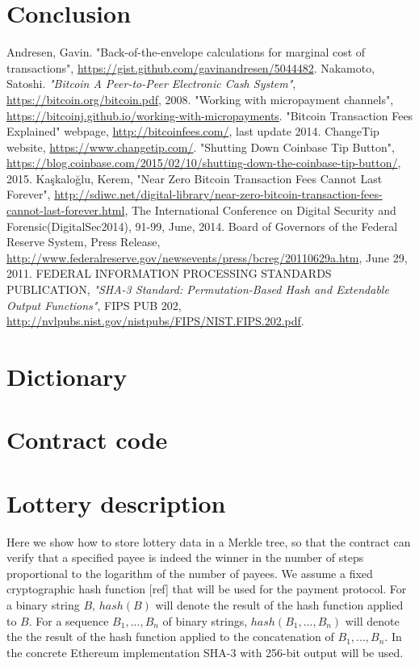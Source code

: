 \documentclass[a4paper]{article}
\begin{document}
\section{Conclusion}
\begin{thebibliography}{9}
 Andresen, Gavin. "Back-of-the-envelope calculations for marginal cost of transactions",
    \url{https://gist.github.com/gavinandresen/5044482}.
 Nakamoto, Satoshi. \textit{"Bitcoin A Peer-to-Peer Electronic Cash System"},
    \url{https://bitcoin.org/bitcoin.pdf}, 2008.
\bibitem[BITCOINJ] "Working with micropayment channels", \url{https://bitcoinj.github.io/working-with-micropayments}.
 "Bitcoin Transaction Fees Explained" webpage, \url{http://bitcoinfees.com/},  last update 2014.
 ChangeTip website, \url{https://www.changetip.com/}.
 "Shutting Down Coinbase Tip Button",
    \url{https://blog.coinbase.com/2015/02/10/shutting-down-the-coinbase-tip-button/}, 2015.
Kaşkaloğlu, Kerem, "Near Zero Bitcoin Transaction Fees Cannot Last Forever",
    \url{http://sdiwc.net/digital-library/near-zero-bitcoin-transaction-fees-cannot-last-forever.html},
    The International Conference on Digital Security and Forensic(DigitalSec2014), 91-99, June, 2014.
 Board of Governors of the Federal Reserve System, Press Release,
    \url{http://www.federalreserve.gov/newsevents/press/bcreg/20110629a.htm}, June 29, 2011.
 FEDERAL INFORMATION PROCESSING STANDARDS PUBLICATION,
    \textit{"SHA-3 Standard: Permutation-Based Hash and Extendable Output Functions"}, FIPS PUB 202,
    \url{http://nvlpubs.nist.gov/nistpubs/FIPS/NIST.FIPS.202.pdf}.
\end{thebibliography}
\appendix
\section{Dictionary}
\section{Contract code}
\section{Lottery description}
    Here we show how to store lottery data in a Merkle tree, so that the contract can verify that a specified payee
    is indeed the winner in the number of steps proportional to the logarithm of the number of payees.
    We assume a fixed cryptographic hash function [ref] that will be used for the payment protocol.
    For a binary string $B$, $hash(B)$ will denote the result of the hash function applied to $B$.
    For a sequence $B_1, ..., B_n$ of binary strings, $hash(B_1, ..., B_n)$ will denote the the result of
    the hash function applied to the concatenation of $B_1, ..., B_n$. In the concrete Ethereum implementation SHA-3
    with 256-bit output will be used.
\end{document}
